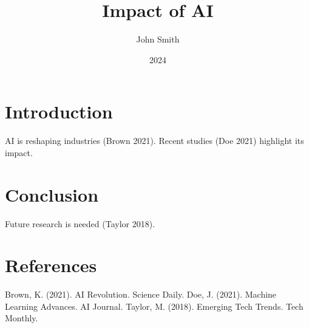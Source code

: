 \documentclass{article}
\title{Impact of AI}
\author{John Smith}
\date{2024}
\begin{document}
\maketitle

\section{Introduction}
AI is reshaping industries (Brown 2021). Recent studies (Doe 2021) highlight its impact.

\section{Conclusion}
Future research is needed (Taylor 2018).

\section{References}
Brown, K. (2021). AI Revolution. Science Daily.
Doe, J. (2021). Machine Learning Advances. AI Journal.
Taylor, M. (2018). Emerging Tech Trends. Tech Monthly.
\end{document}
